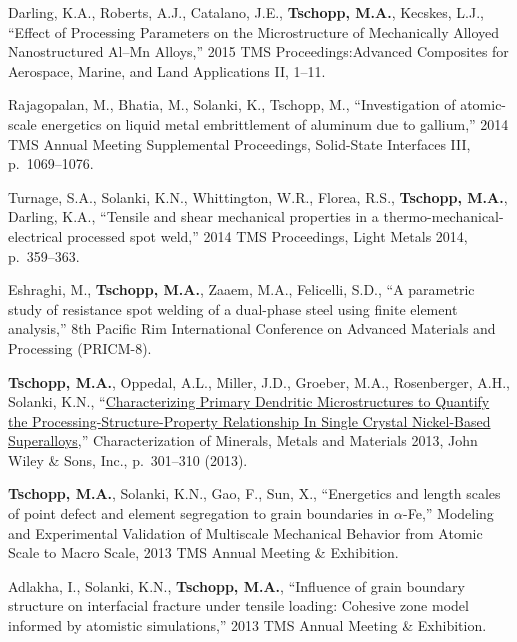 \begin{cvlist}
\item
Darling, K.A., Roberts, A.J., Catalano, J.E., \textbf{Tschopp, M.A.}, Kecskes, L.J., ``Effect of Processing Parameters on the Microstructure of Mechanically Alloyed Nanostructured Al--Mn Alloys,'' 2015 TMS Proceedings:Advanced Composites for Aerospace, Marine, and Land Applications II, 1--11.

\item
{Rajagopalan, M.}, {Bhatia, M.}, Solanki, K., Tschopp, M., ``Investigation of atomic-scale energetics on liquid metal embrittlement of aluminum due to gallium,'' 2014 TMS Annual Meeting Supplemental Proceedings, Solid-State Interfaces III, p.~1069--1076.

\item
{Turnage, S.A.}, Solanki, K.N., Whittington, W.R., Florea, R.S., \textbf{Tschopp, M.A.}, Darling, K.A., ``Tensile and shear mechanical properties in a thermo-mechanical-electrical processed spot weld,'' 2014 TMS Proceedings, Light Metals 2014, p.~359--363.

\item
{Eshraghi, M.}, \textbf{Tschopp, M.A.}, Zaaem, M.A., Felicelli, S.D., ``A parametric study of resistance spot welding of a dual-phase steel using finite element analysis,'' 8th Pacific Rim International Conference on Advanced Materials and Processing (PRICM-8).

\item
\textbf{Tschopp, M.A.}, Oppedal, A.L., Miller, J.D., Groeber, M.A., Rosenberger, A.H., Solanki, K.N., ``\href{http://dx.doi.org/10.1002/9781118659045.ch35}{Characterizing Primary Dendritic Microstructures to Quantify the Processing-Structure-Property Relationship In Single Crystal Nickel-Based Superalloys},'' Characterization of Minerals, Metals and Materials 2013, John Wiley \& Sons, Inc., p.~301--310 (2013).

\item
\textbf{Tschopp, M.A.}, Solanki, K.N., Gao, F., Sun, X., ``Energetics and length scales of point defect and element segregation to grain boundaries in $\alpha$-Fe,'' Modeling and Experimental Validation of Multiscale Mechanical Behavior from Atomic Scale to Macro Scale, 2013 TMS Annual Meeting \& Exhibition.

\item
{Adlakha, I.}, Solanki, K.N., \textbf{Tschopp, M.A.}, ``Influence of grain boundary structure on interfacial fracture under tensile loading: Cohesive zone model informed by atomistic simulations,'' 2013 TMS Annual Meeting \& Exhibition.


\end{cvlist}
